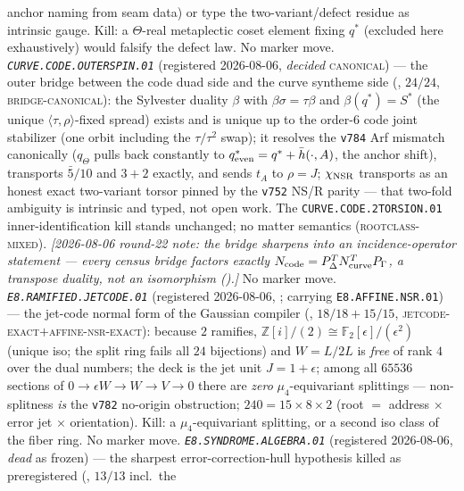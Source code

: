 \documentclass[11pt,a4paper]{article}
\newcommand{\Z}{\mathbb Z}
\begin{document}
anchor naming from seam data) or type the two-variant/defect
residue as intrinsic gauge.  Kill: a $\Theta$-real metaplectic
coset element fixing $q^{*}$ (excluded here exhaustively) would
falsify the defect law.  No marker move.
\emph{\texttt{CURVE.CODE.OUTERSPIN.01}} (registered 2026-08-06,
\emph{decided} \textsc{canonical}) --- the outer bridge between
the code duad side and the curve syntheme side
(, $24/24$,
\textsc{bridge-canonical}): the Sylvester duality $\beta$ with
$\beta\sigma=\tau\beta$ and $\beta(q^{*})=S^{*}$ (the unique
$\langle\tau,\rho\rangle$-fixed spread) exists and is unique up to
the order-6 code joint stabilizer (one orbit including the
$\tau/\tau^2$ swap); it resolves the \texttt{v784} Arf mismatch
canonically ($q_{\Theta}$ pulls back constantly to
$q^{*}_{\rm even}=q^{*}+\bar h(\cdot,A)$, the anchor shift),
transports $\bar5/10$ and $3{+}2$ exactly, and sends $t_A$ to
$\rho=J$; $\chi_{\rm NSR}$ transports as an honest exact
two-variant torsor pinned by the \texttt{v752} NS/R parity ---
that two-fold ambiguity is intrinsic and typed, not open work.
The \texttt{CURVE.CODE.2TORSION.01} inner-identification kill
stands unchanged; no matter semantics
(\textsc{rootclass-mixed}).  \emph{[2026-08-06 round-22 note: the
bridge sharpens into an incidence-operator statement --- every
census bridge factors exactly
$N_{\rm code}=P_\Delta^{T}N_{\rm curve}^{T}P_\Gamma$, a transpose
duality, not an isomorphism
().]}  No marker move.
\emph{\texttt{E8.RAMIFIED.JETCODE.01}} (registered 2026-08-06,
\mE; carrying \texttt{E8.AFFINE.NSR.01}) --- the jet-code normal
form of the Gaussian compiler
(, $18/18+15/15$,
\textsc{jetcode-exact}$+$\textsc{affine-nsr-exact}): because $2$
ramifies, $\Z[i]/(2)\cong\mathbb F_2[\epsilon]/(\epsilon^2)$
(unique iso; the split ring fails all $24$ bijections) and
$W=L/2L$ is \emph{free} of rank $4$ over the dual numbers; the
deck is the jet unit $J=1{+}\epsilon$; among all $65536$ sections
of $0\to\epsilon W\to W\to V\to0$ there are \emph{zero}
$\mu_4$-equivariant splittings --- non-splitness \emph{is} the
\texttt{v782} no-origin obstruction; $240=15\times8\times2$ (root
$=$ address $\times$ error jet $\times$ orientation).  Kill: a
$\mu_4$-equivariant splitting, or a second iso class of the fiber
ring.  No marker move.
\emph{\texttt{E8.SYNDROME.ALGEBRA.01}} (registered 2026-08-06,
\emph{dead} as frozen) --- the sharpest error-correction-hull
hypothesis killed as preregistered
(, $13/13$ incl.\ the
\end{document}
